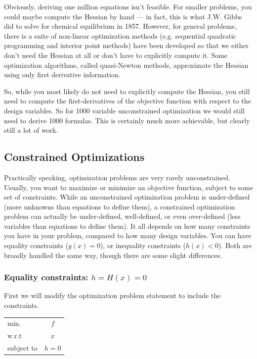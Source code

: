 \documentclass[conf]{new-aiaa}
\begin{document}
    Obviously, deriving one million equations isn't feasible. 
    For smaller problems, you could maybe compute the Hessian by hand --- in fact, this is what J.W. Gibbs did to solve for chemical equilibrium in 1857.
    However, for general problems, there is a suite of non-linear optimization methods (e.g. sequential quadratic programming and interior point methods) have been developed so that we either don't need the Hessian at all or don't have to explicitly compute it. 
    Some optimization algorithms, called quasi-Newton methods, approximate the Hessian using only first derivative information.

    So, while you most likely do not need to explicitly compute the Hessian, you still need to compute the first-derivatives of the objective function with respect to the design variables. 
    So for 1000 variable unconstrained optimization we would still need to derive 1000 formulas. 
    This is certainly much more achievable, but clearly still a lot of work. 

    \subsection{Constrained Optimizations}
        
    Practically speaking, optimization problems are very rarely unconstrained. 
    Usually, you want to maximize or minimize an objective function, subject to some set of constraints. 
    While an unconstrained optimization problem is under-defined (more unknowns than equations to define them), 
    a constrained optimization problem can actually be under-defined, well-defined, or even over-defined (less variables than equations to define them). 
    It all depends on how many constraints you have in your problem, compared to how many design variables. 
    You can have equality constraints ($g(x) = 0$), or inequality constraints ($h(x) < 0$). 
    Both are broadly handled the same way, though there are some slight differences. 


        \subsubsection{Equality constraints: $h = H(x) = 0$}
        First we will modify the optimization problem statement to include the constraints. 
        \begin{table}[H]
            \centering
            \begin{tabular}{lc}
                \hline
                min. & $f$ \\
                w.r.t & $x$ \\ 
                subject to & $h = 0$ \\ \hline 
            \end{tabular}
        \end{table}
\end{document}
